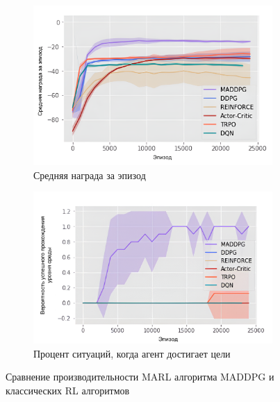 \begin{figure}[H]
	\centering
	\begin{subfigure}[b]{0.45\textwidth}
		\includegraphics[width=\textwidth]{./inc/img/rl_vs_marl.png}
		\caption{Средняя награда за эпизод}
	\end{subfigure}
	\hfill
	\begin{subfigure}[b]{0.45\textwidth}
		\includegraphics[width=\textwidth]{./inc/img/rl_vs_marl_2.png}
		\caption{Процент ситуаций, когда агент достигает цели}
	\end{subfigure}
	\caption{\centering Сравнение производительности MARL алгоритма MADDPG и классических RL алгоритмов}
	\label{aboba}
\end{figure}



